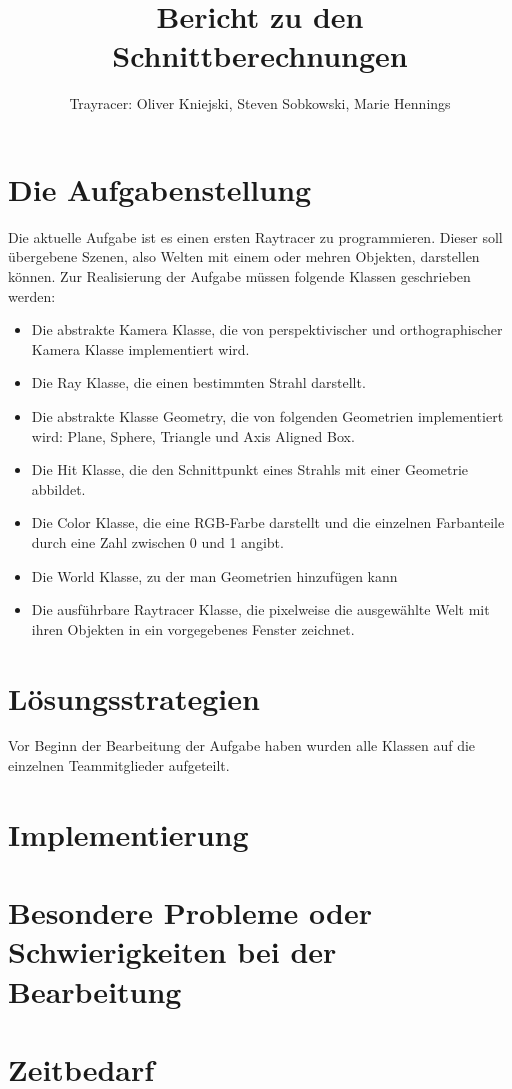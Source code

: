 \documentclass[a4paper,parskip=half,11pt]{scrartcl}
\author{Trayracer: Oliver Kniejski, Steven Sobkowski, Marie Hennings}
\title{Bericht zu den Schnittberechnungen}
\begin{document}
 
\maketitle

\section*{Die Aufgabenstellung}

Die aktuelle Aufgabe ist es einen ersten Raytracer zu programmieren.
Dieser soll übergebene Szenen, also Welten mit einem oder mehren Objekten, darstellen können.
Zur Realisierung der Aufgabe müssen folgende Klassen geschrieben werden:
\begin{itemize}
\item Die abstrakte Kamera Klasse, die von perspektivischer und orthographischer Kamera Klasse implementiert wird. 
\item Die Ray Klasse, die einen bestimmten Strahl darstellt.
\item Die abstrakte Klasse Geometry, die von folgenden Geometrien implementiert wird: Plane, Sphere, Triangle und Axis Aligned Box.
\item Die Hit Klasse, die den Schnittpunkt eines Strahls mit einer Geometrie abbildet.
\item Die Color Klasse, die eine RGB-Farbe darstellt und die einzelnen Farbanteile durch eine Zahl zwischen 0 und 1 angibt.
\item Die World Klasse, zu der man Geometrien hinzufügen kann
\item Die ausführbare Raytracer Klasse, die pixelweise die ausgewählte Welt mit ihren Objekten in ein vorgegebenes Fenster zeichnet.
\end{itemize}

\section*{Lösungsstrategien}
Vor Beginn der Bearbeitung der Aufgabe haben wurden alle Klassen auf die einzelnen Teammitglieder aufgeteilt.

\section*{Implementierung}

\section*{Besondere Probleme oder Schwierigkeiten bei der Bearbeitung}

\section*{Zeitbedarf}
\end{document}
